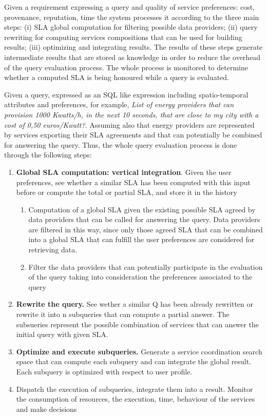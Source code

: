 Given a requirement expressing a query and quality of service preferences: cost, provenance, reputation, time the system processes it according to the three  main steps: (i) SLA global computation for filtering possible data providers; (ii) query rewriting for computing services compositions that can be used for building results; (iii) optimizing and integrating results. The results of these steps generate intermediate results that are stored as knowledge in order to reduce the overhead of the query evaluation process. The whole process is monitored to determine whether a computed SLA is being honoured while a query is evaluated. 

 Given a query, expressed as an SQL like expression including spatio-temporal attributes and preferences, for example, {\em List of energy providers that can provision 1000 Kwatts/h, in the next 10 seconds, that are close to my city with a cost of 0,50 euros/Kwatt?}. Assuming also that energy providers are represented by services exporting their SLA agreements and that can potentially be combined for answering the query. Thus, the whole query evaluation process is done through the following steps:


\begin{enumerate}

\item  {\bf Global SLA computation: vertical integration}. 
Given the user preferences, see whether a similar SLA has been computed with this input before or compute the total or partial SLA, and store it in the history

 \begin{enumerate}
\item Computation of a global SLA given the existing possible SLA agreed by data providers that can be called for answering the query. Data providers are filtered in this way, since only those agreed SLA that can be combined into a global SLA that can fulfill the user preferences are considered for retrieving data.

  
  \item Filter the data providers that can potentially participate in the evaluation of the query taking into consideration the preferences associated to the query
  \end{enumerate}
  
  \item {\bf Rewrite the query.} See wether a similar Q has been already rewritten or rewrite it into n subqueries that can compute a partial answer. The subsueries represent the possible combination of services that can answer the initial query with given SLA.
  
  
  \item {\bf Optimize and execute subqueries.} Generate a service coordination search space that can compute each subquery and can integrate the global result. 
Each subquery is optimized with respect to user profile.

  \item Dispatch the execution of subqueries, integrate them into a result. Monitor the consumption of resources, the execution, time, behaviour of the services and make decisions
\end{enumerate}

